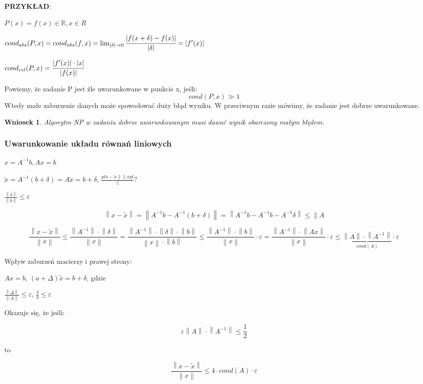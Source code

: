 \documentclass[hidelinks,a4paper,fleqn]{article}
\newcommand{\RR}{\mathbb{R}}
\newcommand{\ra}{\rightarrow}
\newcommand{\pl}{\parallel}
\newcommand{\norm}[1]{\left\lVert#1\right\rVert}
\newtheorem{wniosek}{Wniosek}
\begin{document}
\textbf{PRZYKŁAD}:

$P(x) = f(x) \in \RR, x \in R$

$cond_{abs} (P, x) = cond_{abs}(f, x) = \lim_{| \delta | \ra 0} \cfrac{| f(x + \delta) - f(x)|}{| \delta |} = |f'(x)|$

$cond_{rel}(P, x) = \cfrac{|f'(x)| \cdot |x|}{|f(x)|}$

Powiemy, że zadanie P jest źle uwarunkowane w punkcie x, jeśli:
\[
	cond(P, x) \gg 1
\]
Wtedy małe zaburzenie danych może spowodować duży błąd wyniku. W przeciwnym razie mówimy, że zadanie jest dobrze uwarunkowane.

\begin{wniosek} Algorytm NP w zadaniu dobrze uwarunkowanym musi dawać wynik obarczony małym błędem. \end{wniosek}

\subsubsection{Uwarunkowanie układu równań liniowych}


$x = A^{-1}b, Ax = b$

$\tilde{x} = A^{-1}(b + \delta) = A\tilde{x} = b + \delta$, $\frac{pl x - \tilde{x} \norm{}{} x pl} \leq ?$


$\frac{\norm{\delta}}{\norm{b}} \leq \varepsilon$

\[
	\norm{x - \tilde{x}} = \norm{A^{-1}b - A^{-1}(b + \delta)} = \norm{A^{-1}b - A^{-1}b - A^{-1}\delta} \leq \pl A
\]


\[
	\frac{\norm{x - \tilde{x}}}{\norm{x}} \leq \frac{\norm{A^{-1}} \cdot \norm{\delta}}{\norm{x}} = \frac{\norm{A^{-1}} \cdot \norm{\delta} \cdot \norm{b}}{\norm{x} \cdot \norm{b}} \leq \frac{\norm{A^{-1}} \cdot \norm{b}}{\norm{x}} \cdot \varepsilon = \frac{\norm{A^{-1}} \cdot \norm{Ax}}{\norm{x}} \cdot \varepsilon \leq \underbrace{\norm{A} \cdot \norm{A^{-1}}}_{cond(A)} \cdot \varepsilon
\]

Wpływ zaburzeń macierzy i prawej strony:

$Ax = b$, $(a + \Delta)\tilde{x} = b + \delta$, gdzie

$\frac{\norm{\Delta}}{\norm{A}} \leq \varepsilon$, $\frac{\delta}{b} \leq \varepsilon$

Okazuje się, że jeśli:

\[
	\varepsilon \norm{A} \cdot \norm{A^{-1}} \leq \frac{1}{2}
\]

to

\[
	\frac{\norm{x - \tilde{x}}}{\norm{x}} \leq 4 \cdot cond(A) \cdot \varepsilon
\]
\end{document}
